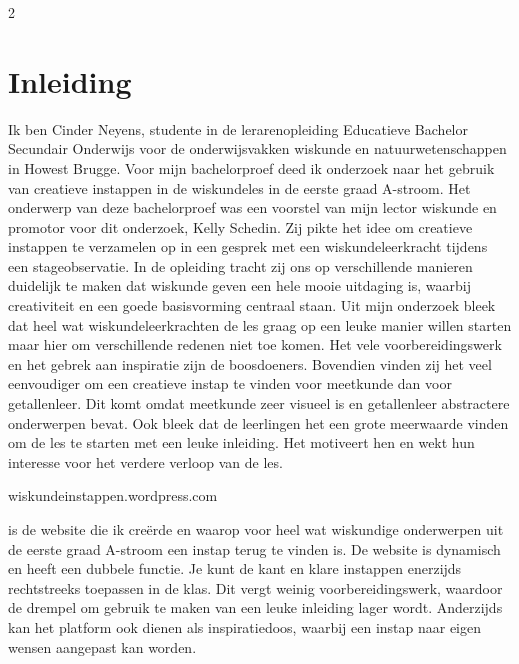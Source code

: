 \begin{multicols}{2}                      
\inhoudstafelLoep		                  %




\section{Inleiding}
Ik ben Cinder Neyens, studente in de lerarenopleiding Educatieve Bachelor Secundair Onderwijs voor de onderwijsvakken wiskunde en natuurwetenschappen in Howest Brugge. Voor mijn bachelorproef deed ik onderzoek naar het gebruik van creatieve instappen in de wiskundeles in de eerste graad A-stroom. Het onderwerp van deze bachelorproef was een voorstel van mijn lector wiskunde en promotor voor dit onderzoek, Kelly Schedin. Zij pikte het idee om creatieve instappen te verzamelen op in een gesprek met een wiskundeleerkracht tijdens een stageobservatie. In de opleiding tracht zij ons op verschillende manieren duidelijk te maken dat wiskunde geven een hele mooie uitdaging is, waarbij creativiteit en een goede basisvorming centraal staan. Uit mijn onderzoek bleek dat heel wat wiskundeleerkrachten de les graag op een leuke manier willen starten maar hier om verschillende redenen niet toe komen. Het vele voorbereidingswerk en het gebrek aan inspiratie zijn de boosdoeners. Bovendien vinden zij het veel eenvoudiger om een creatieve instap te vinden voor meetkunde dan voor getallenleer. Dit komt omdat meetkunde zeer visueel is en getallenleer abstractere onderwerpen bevat. Ook bleek dat de leerlingen het een grote meerwaarde vinden om de les te starten met een leuke inleiding. Het motiveert hen en wekt hun interesse voor het verdere verloop van de les. 

\begin{center}
wiskundeinstappen.wordpress.com
\end{center}

is de website die ik creërde en waarop voor heel wat wiskundige onderwerpen uit de eerste graad A-stroom een instap terug te vinden is. De website is dynamisch en heeft een dubbele functie. Je kunt de kant en klare instappen enerzijds rechtstreeks toepassen in de klas. Dit vergt weinig voorbereidingswerk, waardoor de drempel om gebruik te maken van een leuke inleiding lager wordt. Anderzijds kan het platform ook dienen als inspiratiedoos, waarbij een instap naar eigen wensen aangepast kan worden. 


\end{multicols}
